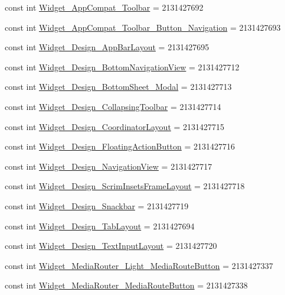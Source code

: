\begin{CompactItemize}
const int \hyperlink{class__2doo_1_1_droid_1_1_resource_1_1_style_cac4fc1d01bf496f3438b23fe75bb47a}{Widget\_\-AppCompat\_\-Toolbar} = 2131427692
\item 
const int \hyperlink{class__2doo_1_1_droid_1_1_resource_1_1_style_c3145ea49713f5a77afe5e7a487c0269}{Widget\_\-AppCompat\_\-Toolbar\_\-Button\_\-Navigation} = 2131427693
\item 
const int \hyperlink{class__2doo_1_1_droid_1_1_resource_1_1_style_559d362a56a509cbfacce48b2b2b5ef7}{Widget\_\-Design\_\-AppBarLayout} = 2131427695
\item 
const int \hyperlink{class__2doo_1_1_droid_1_1_resource_1_1_style_700ee8ce44786e6060f49905ec9ac9cc}{Widget\_\-Design\_\-BottomNavigationView} = 2131427712
\item 
const int \hyperlink{class__2doo_1_1_droid_1_1_resource_1_1_style_d691f8469e44f54f54684183b2c7abf8}{Widget\_\-Design\_\-BottomSheet\_\-Modal} = 2131427713
\item 
const int \hyperlink{class__2doo_1_1_droid_1_1_resource_1_1_style_8dab32e6279e9c1a28db6e3baa357c78}{Widget\_\-Design\_\-CollapsingToolbar} = 2131427714
\item 
const int \hyperlink{class__2doo_1_1_droid_1_1_resource_1_1_style_38dbf10b489ba96fa0441d9fce31ca7f}{Widget\_\-Design\_\-CoordinatorLayout} = 2131427715
\item 
const int \hyperlink{class__2doo_1_1_droid_1_1_resource_1_1_style_6f6752a9e64c124f9cbc786607c4aa55}{Widget\_\-Design\_\-FloatingActionButton} = 2131427716
\item 
const int \hyperlink{class__2doo_1_1_droid_1_1_resource_1_1_style_6d7c0140c6ec6ed718511073b68340ee}{Widget\_\-Design\_\-NavigationView} = 2131427717
\item 
const int \hyperlink{class__2doo_1_1_droid_1_1_resource_1_1_style_ef9c2c28c210e272628631e6b6945e30}{Widget\_\-Design\_\-ScrimInsetsFrameLayout} = 2131427718
\item 
const int \hyperlink{class__2doo_1_1_droid_1_1_resource_1_1_style_228c18ed3a23ab0844e8ceb8a18350c3}{Widget\_\-Design\_\-Snackbar} = 2131427719
\item 
const int \hyperlink{class__2doo_1_1_droid_1_1_resource_1_1_style_4315fa18e0915402bd9b6da6bdf0ed5a}{Widget\_\-Design\_\-TabLayout} = 2131427694
\item 
const int \hyperlink{class__2doo_1_1_droid_1_1_resource_1_1_style_b82c7dc3b0d7d4bf104569a3365a1f05}{Widget\_\-Design\_\-TextInputLayout} = 2131427720
\item 
const int \hyperlink{class__2doo_1_1_droid_1_1_resource_1_1_style_81852a582d7f191494e08685fdda07b9}{Widget\_\-MediaRouter\_\-Light\_\-MediaRouteButton} = 2131427337
\item 
const int \hyperlink{class__2doo_1_1_droid_1_1_resource_1_1_style_a84e23bc111c8b945d46ec608feb8067}{Widget\_\-MediaRouter\_\-MediaRouteButton} = 2131427338
\end{CompactItemize}
